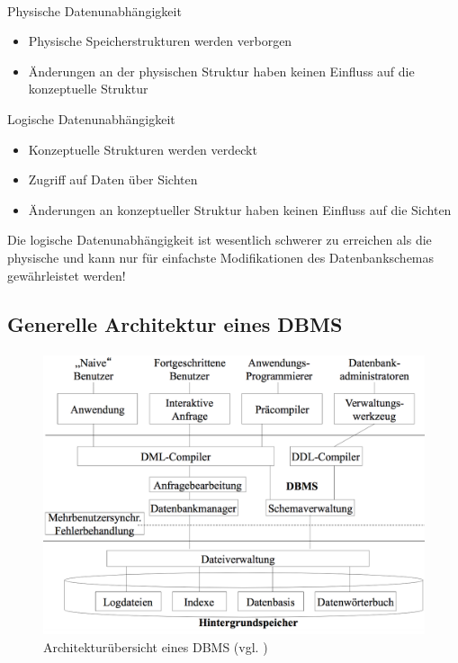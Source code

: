 \begin{frame}{\insertsection}
	\framesubtitle{\insertsubsection}
	\begin{block}{Physische Datenunabhängigkeit}
		\begin{itemize}
			\item Physische Speicherstrukturen werden verborgen
			\item Änderungen an der physischen Struktur haben keinen Einfluss auf die konzeptuelle Struktur
		\end{itemize}
	\end{block}

	\begin{block}{Logische Datenunabhängigkeit}
		\begin{itemize}
			\item Konzeptuelle Strukturen werden verdeckt
			\item Zugriff auf Daten über Sichten
			\item Änderungen an konzeptueller Struktur haben keinen Einfluss auf die Sichten
		\end{itemize}
	\end{block}
	\alert{Die logische Datenunabhängigkeit ist wesentlich schwerer zu erreichen als die physische und kann nur für einfachste 
		Modifikationen des Datenbankschemas gewährleistet werden!}
\end{frame}

\subsection{Generelle Architektur eines DBMS}
\begin{frame}{\insertsection}
	\framesubtitle{\insertsubsection}

	\begin{figure}
		\includegraphics[scale=0.16]{img/db_arch.png}
		\caption{Architekturübersicht eines DBMS (vgl. \cite[S. 31]{KE15})}
	\end{figure}
\end{frame}

